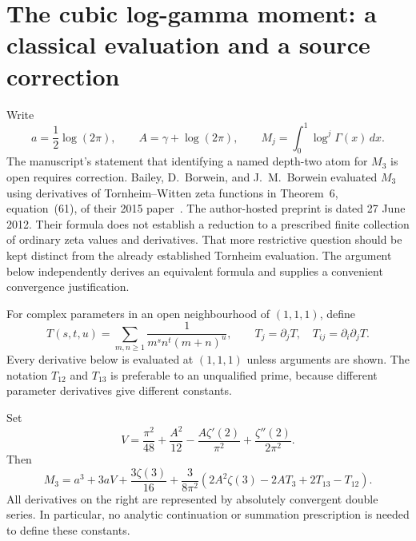 \section{The cubic log-gamma moment: a classical evaluation and a source correction}
\label{sec:cubic}

Write
\[
 a=\frac12\log(2\pi),\qquad A=\gamma+\log(2\pi),\qquad
 M_j=\int_0^1\log^j\Gamma(x)\,dx.
\]
The manuscript's statement that identifying a named depth-two atom for $M_3$
is open requires correction.  Bailey, D.~Borwein, and J.~M.~Borwein evaluated
$M_3$ using derivatives of Tornheim--Witten zeta functions in Theorem~6,
equation~(61), of their 2015 paper~\cite{BBB}.  The author-hosted preprint is dated
27 June 2012.  Their formula does not establish a reduction to a prescribed
finite collection of ordinary zeta values and derivatives.  That more
restrictive question should be kept distinct from the already established
Tornheim evaluation.  The argument below independently derives an equivalent
formula and supplies a convenient convergence justification.

For complex parameters in an open neighbourhood of $(1,1,1)$, define
\[
 T(s,t,u)=\sum_{m,n\ge1}\frac1{m^s n^t(m+n)^u},
 \qquad T_j=\partial_jT,\quad T_{ij}=\partial_i\partial_jT.
\]
Every derivative below is evaluated at $(1,1,1)$ unless arguments are shown.
The notation $T_{12}$ and $T_{13}$ is preferable to an unqualified prime,
because different parameter derivatives give different constants.

\begin{theorem}
Set
\[
 V=\frac{\pi^2}{48}+\frac{A^2}{12}
       -\frac{A\zeta'(2)}{\pi^2}+\frac{\zeta''(2)}{2\pi^2}.
\]
Then
\begin{equation}\label{cubic:main}
 \boxed{\displaystyle
 M_3=a^3+3aV+\frac{3\zeta(3)}{16}
 +\frac{3}{8\pi^2}
   \left(2A^2\zeta(3)-2A T_3+2T_{13}-T_{12}\right).}
\end{equation}
All derivatives on the right are represented by absolutely convergent
double series.  In particular, no analytic continuation or summation
prescription is needed to define these constants.
\end{theorem}

